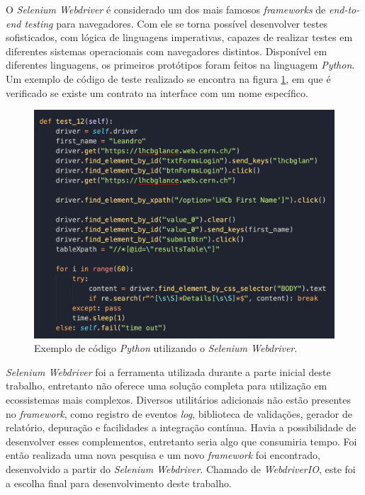 O \emph{Selenium Webdriver} é considerado um dos mais famosos \emph{frameworks} de \emph{end-to-end testing} para navegadores. Com ele se torna possível desenvolver testes sofisticados, com lógica de linguagens imperativas, capazes de realizar testes em diferentes sistemas operacionais com navegadores distintos. Disponível em diferentes linguagens, os primeiros protótipos foram feitos na linguagem \emph{Python}. Um exemplo de código de teste realizado se encontra na figura \ref{fig:e2e-ferramenta-2}, em que é verificado se existe um contrato na interface com um nome específico.

\begin{figure}[H]
    \centering
    \includegraphics[width=13cm]{source/4-solucao/images/e2e-ferramenta-2.png}
    \caption{Exemplo de código \emph{Python} utilizando o \emph{Selenium Webdriver}.}
    \label{fig:e2e-ferramenta-2}
\end{figure}

\emph{Selenium Webdriver} foi a ferramenta utilizada durante a parte inicial deste trabalho, entretanto não oferece uma solução completa para utilização em ecossistemas mais complexos. Diversos utilitários adicionais não estão presentes no \emph{framework}, como registro de eventos \emph{log}, biblioteca de validações, gerador de relatório, depuração e facilidades a integração contínua. Havia a possibilidade de desenvolver esses complementos, entretanto seria algo que consumiria tempo. Foi então realizada uma nova pesquisa e um novo \emph{framework} foi encontrado, desenvolvido a partir do \emph{Selenium Webdriver}. Chamado de \emph{WebdriverIO}, este foi a escolha final para desenvolvimento deste trabalho.

